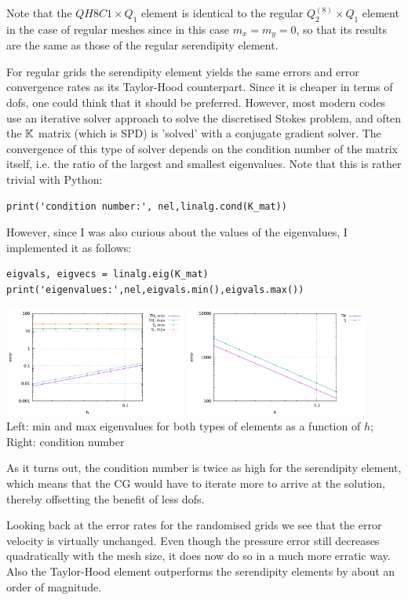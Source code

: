 Note that the $QH8C1\times Q_1$ element is identical to the regular $Q_2^{(8)}\times Q_1$ element 
in the case of regular meshes since in this case $m_x=m_y=0$, so that its results are the same as those 
of the regular serendipity element. 

For regular grids the serendipity element yields the same errors and error convergence 
rates as its Taylor-Hood counterpart. Since it is cheaper in terms of dofs, 
one could think that it should be preferred. However, most modern codes 
use an iterative solver approach to solve the discretised Stokes problem, and 
often the ${\mathbb{K}}$ matrix (which is SPD) is 'solved' with a conjugate gradient solver.  
The convergence of this type of solver depends on the condition number of the matrix
itself, i.e. the ratio of the largest and smallest eigenvalues. 
Note that this is rather trivial with Python:

\begin{lstlisting}
print('condition number:', nel,linalg.cond(K_mat))
\end{lstlisting}
However, since I was also curious about the values of the eigenvalues, I implemented 
it as follows:
\begin{lstlisting}
eigvals, eigvecs = linalg.eig(K_mat)
print('eigenvalues:',nel,eigvals.min(),eigvals.max())
\end{lstlisting}

\begin{center}
\includegraphics[width=6cm]{python_codes/fieldstone_52/images/eigenvalues.pdf}
\includegraphics[width=6cm]{python_codes/fieldstone_52/images/eigenvalues_ratio.pdf}\\
{\captionfont Left: min and max eigenvalues for both types of elements as a function of $h$; 
Right: condition number}
\end{center}
As it turns out, the condition number is twice as high for the serendipity element, 
which means that the CG would have to iterate more to arrive at the solution, 
thereby offsetting the benefit of less dofs.

Looking back at the error rates for the randomised grids we see that the error 
velocity is virtually unchanged. Even though the pressure error still decreases 
quadratically with the mesh size, it does now do so in a much more erratic way. 
Also the Taylor-Hood element outperforms the serendipity elements by about an 
order of magnitude. 




